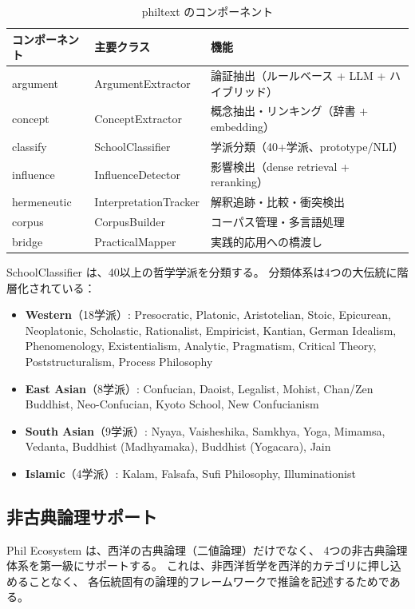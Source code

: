 \documentclass[a4paper,11pt]{ltjsarticle}
\begin{document}
\begin{table}[H]
\centering
\caption{philtext のコンポーネント}
\label{tab:philtext}
\small
\begin{tabular}{llp{5.5cm}}
\toprule
\textbf{コンポーネント} & \textbf{主要クラス} & \textbf{機能} \\
\midrule
argument & ArgumentExtractor & 論証抽出（ルールベース + LLM + ハイブリッド） \\
concept & ConceptExtractor & 概念抽出・リンキング（辞書 + embedding） \\
classify & SchoolClassifier & 学派分類（40+学派、prototype/NLI） \\
influence & InfluenceDetector & 影響検出（dense retrieval + reranking） \\
hermeneutic & InterpretationTracker & 解釈追跡・比較・衝突検出 \\
corpus & CorpusBuilder & コーパス管理・多言語処理 \\
bridge & PracticalMapper & 実践的応用への橋渡し \\
\bottomrule
\end{tabular}
\end{table}

SchoolClassifier は、40以上の哲学学派を分類する。
分類体系は4つの大伝統に階層化されている：

\begin{itemize}[leftmargin=2em]
  \item \textbf{Western}（18学派）: Presocratic, Platonic, Aristotelian, Stoic, Epicurean, Neoplatonic, Scholastic, Rationalist, Empiricist, Kantian, German Idealism, Phenomenology, Existentialism, Analytic, Pragmatism, Critical Theory, Poststructuralism, Process Philosophy
  \item \textbf{East Asian}（8学派）: Confucian, Daoist, Legalist, Mohist, Chan/Zen Buddhist, Neo-Confucian, Kyoto School, New Confucianism
  \item \textbf{South Asian}（9学派）: Nyaya, Vaisheshika, Samkhya, Yoga, Mimamsa, Vedanta, Buddhist (Madhyamaka), Buddhist (Yogacara), Jain
  \item \textbf{Islamic}（4学派）: Kalam, Falsafa, Sufi Philosophy, Illuminationist
\end{itemize}

\subsection{非古典論理サポート}

Phil Ecosystem は、西洋の古典論理（二値論理）だけでなく、
4つの非古典論理体系を第一級にサポートする。
これは、非西洋哲学を西洋的カテゴリに押し込めることなく、
各伝統固有の論理的フレームワークで推論を記述するためである。
\end{document}
